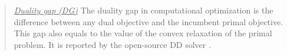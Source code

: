\begin{quote}
\noindent\underline{\textit{Duality gap (DG)}} The duality gap in computational optimization is the difference between any dual objective and the incumbent primal objective. This gap also equals to the value of the convex relaxation of the primal problem. It is reported by the open-source DD solver \dsp.
\end{quote}


